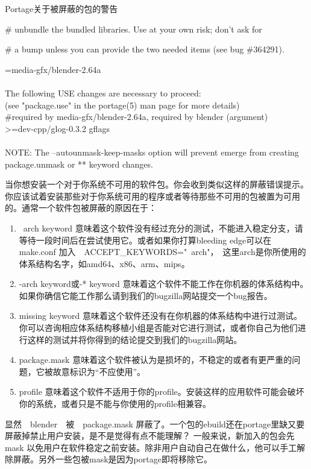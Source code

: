 \begin{enumerate}
\begin{example}{Portage关于被屏蔽的包的警告}
\begin{code}
\# unbundle the bundled libraries. Use at your own risk; don't ask for

\# a bump unless you can provide the two needed items (see bug \#364291).

=media-gfx/blender-2.64a\\
\\
The following USE changes are necessary to proceed:\\
 (see "package.use" in the portage(5) man page for more details)\\
\#required by media-gfx/blender-2.64a, required by blender (argument)\\
>=dev-cpp/glog-0.3.2 gflags\\
\\
NOTE: The --autounmask-keep-masks option will prevent emerge
      from creating package.unmask or ** keyword changes.
\end{code}

\end{example}

当你想安装一个对于你系统不可用的软件包。你会收到类似这样的屏蔽错误提示。你应该试着安装那些对于你系统可用的程序或者等待那些不可用的包被置为可用的。通常一个软件包被屏蔽的原因在于：

\begin{enumerate}

\item ~arch keyword 意味着这个软件没有经过充分的测试，不能进入稳定分支，请等待一段时间后在尝试使用它。或者如果你打算bleeding edge可以在　make.conf 加入　ACCEPT\_KEYWORDS="~arch"，　这里arch是你所使用的体系结构名字，如amd64、x86、arm、mips。

\item -arch keyword或-* keyword 意味着这个软件不能工作在你机器的体系结构中。如果你确信它能工作那么请到我们的bugzilla网站提交一个bug报告。
\item missing keyword 意味着这个软件还没有在你机器的体系结构中进行过测试。你可以咨询相应体系结构移植小组是否能对它进行测试，或者你自己为他们进行这样的测试并将你得到的结论提交到我们的bugzilla网站。
\item package.mask 意味着这个软件被认为是损坏的，不稳定的或者有更严重的问题，它被故意标识为“不应使用”。
\item profile 意味着这个软件不适用于你的profile。安装这样的应用软件可能会破坏你的系统，或者只是不能与你使用的profile相兼容。

\end{enumerate}

显然　blender　被　package.mask 屏蔽了。一个包的ebuild还在portage里缺又要屏蔽掉禁止用户安装，是不是觉得有点不能理解？
一般来说，新加入的包会先 mask 以免用户在软件稳定之前安装。除非用户自动自己在做什么，他可以手工解除屏蔽。另外一些包被mask是因为portage即将移除它。



\end{enumerate}
